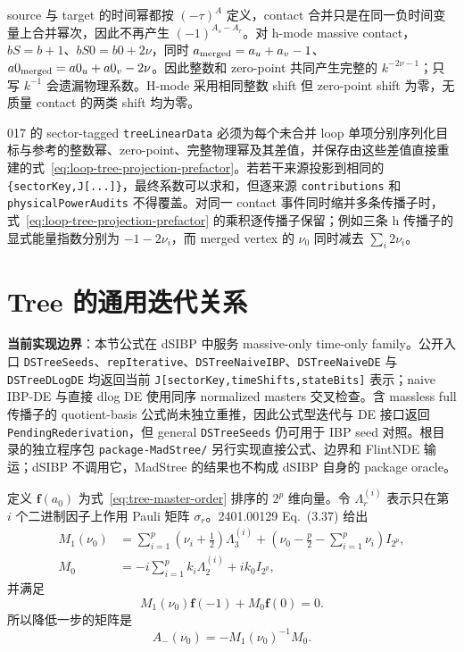 ﻿\documentclass[a4paper,11pt]{article}
\begin{document}
source 与 target 的时间幂都按 $(-\tau)^A$ 定义，contact 合并只是在同一负时间变量上合并幂次，因此不再产生 $(-1)^{A_s-A_r}$。对 h-mode massive contact，$bS=b+1$、$bS0=b0+2\nu$，同时 $a_{\rm merged}=a_u+a_v-1$、$a0_{\rm merged}=a0_u+a0_v-2\nu$。因此整数和 zero-point 共同产生完整的 $k^{-2\nu-1}$；只写 $k^{-1}$ 会遗漏物理系数。H-mode 采用相同整数 shift 但 zero-point shift 为零，无质量 contact 的两类 shift 均为零。

017 的 sector-tagged \texttt{treeLinearData} 必须为每个未合并 loop 单项分别序列化目标与参考的整数幂、zero-point、完整物理幂及其差值，并保存由这些差值直接重建的式~\eqref{eq:loop-tree-projection-prefactor}。若若干来源投影到相同的 \texttt{\{sectorKey,J[...]\}}，最终系数可以求和，但逐来源 \texttt{contributions} 和 \texttt{physicalPowerAudits} 不得覆盖。对同一 contact 事件同时缩并多条传播子时，式~\eqref{eq:loop-tree-projection-prefactor} 的乘积逐传播子保留；例如三条 h 传播子的显式能量指数分别为 $-1-2\nu_i$，而 merged vertex 的 $\nu_0$ 同时减去 $\sum_i2\nu_i$。

\section{Tree 的通用迭代关系}

\textbf{当前实现边界}：本节公式在 dSIBP 中服务 massive-only time-only family。公开入口 \texttt{DSTreeSeeds}、\texttt{repIterative}、\texttt{DSTreeNaiveIBP}、\texttt{DSTreeNaiveDE} 与 \texttt{DSTreeDLogDE} 均返回当前 \texttt{J[sectorKey,timeShifts,stateBits]} 表示；naive IBP-DE 与直接 dlog DE 使用同序 normalized masters 交叉检查。含 massless full 传播子的 quotient-basis 公式尚未独立重推，因此公式型迭代与 DE 接口返回 \texttt{PendingRederivation}，但 general \texttt{DSTreeSeeds} 仍可用于 IBP seed 对照。根目录的独立程序包 \texttt{package-MadStree/} 另行实现直接公式、边界和 FlintNDE 输运；dSIBP 不调用它，MadStree 的结果也不构成 dSIBP 自身的 package oracle。

定义 $\bm f(a_0)$ 为式~\eqref{eq:tree-master-order} 排序的 $2^p$ 维向量。令 $\Lambda_r^{(i)}$ 表示只在第 $i$ 个二进制因子上作用 Pauli 矩阵 $\sigma_r$。2401.00129 Eq.~(3.37) 给出
\begin{align}
 M_1(\nu_0)
 &=\sum_{i=1}^{p}\left(\nu_i+\frac12\right)\Lambda_3^{(i)}
 +\left(\nu_0-\frac p2-\sum_{i=1}^{p}\nu_i\right)I_{2^p},\\
 M_0
 &=-i\sum_{i=1}^{p}k_i\Lambda_2^{(i)}+ik_0 I_{2^p},
 \label{eq:tree-m10}
\end{align}
并满足
\begin{equation}
 M_1(\nu_0)\bm f(-1)+M_0\bm f(0)=0.
\end{equation}
所以降低一步的矩阵是
\begin{equation}
 A_-(\nu_0)=-M_1(\nu_0)^{-1}M_0.
 \label{eq:tree-aminus}
\end{equation}
\end{document}

